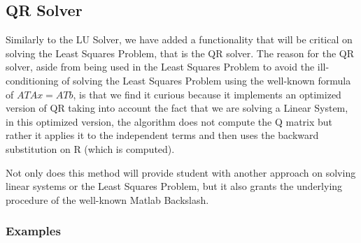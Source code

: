 \subsection{QR Solver}
Similarly to the LU Solver, we have added a functionality that will be critical on solving the Least Squares Problem, that is the QR solver. The reason for the QR solver, aside from being used in the Least Squares Problem to avoid the ill-conditioning of solving the Least Squares Problem using the well-known formula of $A T A x= A T b$, is that we find it curious because it implements an optimized version of QR taking into account the fact that we are solving a Linear System, in this optimized version, the algorithm does not compute the Q matrix but rather it applies it to the independent terms and then uses the backward substitution on R (which is computed).

Not only does this method will provide student with another approach on solving linear systems or the Least Squares Problem, but it also grants the underlying procedure of the well-known Matlab Backslash.

\subsubsection{Examples}



